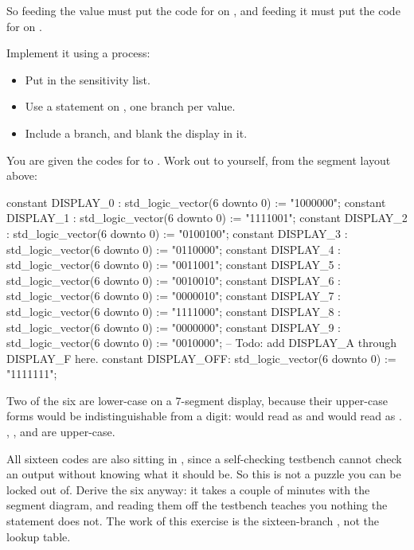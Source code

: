 \noindent So feeding  the value  must put the code for  on
, and feeding it  must put the code for  on .

Implement it using a process:
\begin{itemize}
  \item Put  in the sensitivity list.
  \item Use a  statement on , one branch per value.
  \item Include a  branch, and blank the display in it.
\end{itemize}
You are given the codes for  to . Work out  to  yourself, from the
segment layout above:

\begin{vhdlcode}
constant DISPLAY_0  : std_logic_vector(6 downto 0) := "1000000";
constant DISPLAY_1  : std_logic_vector(6 downto 0) := "1111001";
constant DISPLAY_2  : std_logic_vector(6 downto 0) := "0100100";
constant DISPLAY_3  : std_logic_vector(6 downto 0) := "0110000";
constant DISPLAY_4  : std_logic_vector(6 downto 0) := "0011001";
constant DISPLAY_5  : std_logic_vector(6 downto 0) := "0010010";
constant DISPLAY_6  : std_logic_vector(6 downto 0) := "0000010";
constant DISPLAY_7  : std_logic_vector(6 downto 0) := "1111000";
constant DISPLAY_8  : std_logic_vector(6 downto 0) := "0000000";
constant DISPLAY_9  : std_logic_vector(6 downto 0) := "0010000";
-- Todo: add DISPLAY_A through DISPLAY_F here.
constant DISPLAY_OFF: std_logic_vector(6 downto 0) := "1111111";
\end{vhdlcode}

\noindent Two of the six are lower-case on a 7-segment display, because their upper-case forms would
be indistinguishable from a digit:  would read as  and  would read as
. , ,  and  are upper-case.

All sixteen codes are also sitting in , since a self-checking testbench cannot
check an output without knowing what it should be. So this is not a puzzle you can be locked out of.
Derive the six anyway: it takes a couple of minutes with the segment diagram, and reading them off
the testbench teaches you nothing the  statement does not. The work of this exercise is
the sixteen-branch , not the lookup table.


